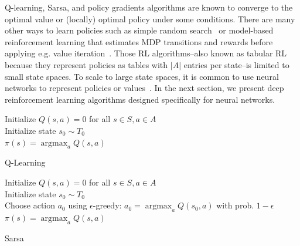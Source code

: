 Q-learning, Sarsa, and policy gradients algorithms are known to converge to the optimal value or (locally) optimal policy under some conditions.
There are many other ways to learn policies such as simple random search~\cite{random-search} or model-based reinforcement learning that estimates MDP transitions and rewards before applying e.g. value iteration~\cite{ucbvi}. 
Those RL algorithms--also known as tabular RL because they represent policies as tables with $|A|$ entries per state--is limited to small state spaces.
To scale to large state spaces, it is common to use neural networks to represent policies or values~\cite{tdgammon}.
In the next section, we present deep reinforcement learning algorithms designed specifically for neural networks.
\begin{algorithm}
    Initialize $Q(s,a) = 0$ for all $s \in S, a \in A$ \\
    Initialize state $s_0 \sim T_0$ \\
    $\pi(s) = \operatorname{argmax}_a Q(s,a)$ 
    \caption{Q-Learning}\label{alg:qlearning}
\end{algorithm}


\begin{algorithm}
    Initialize $Q(s,a) = 0$ for all $s \in S, a \in A$ \\
    Initialize state $s_0 \sim T_0$ \\
    Choose action $a_0$ using $\epsilon$-greedy: $a_0 = \operatorname{argmax}_a Q(s_0,a)$ with prob. $1-\epsilon$ \\
    $\pi(s) = \operatorname{argmax}_a Q(s,a)$ 
    \caption{Sarsa}\label{alg:sarsa}
\end{algorithm}


